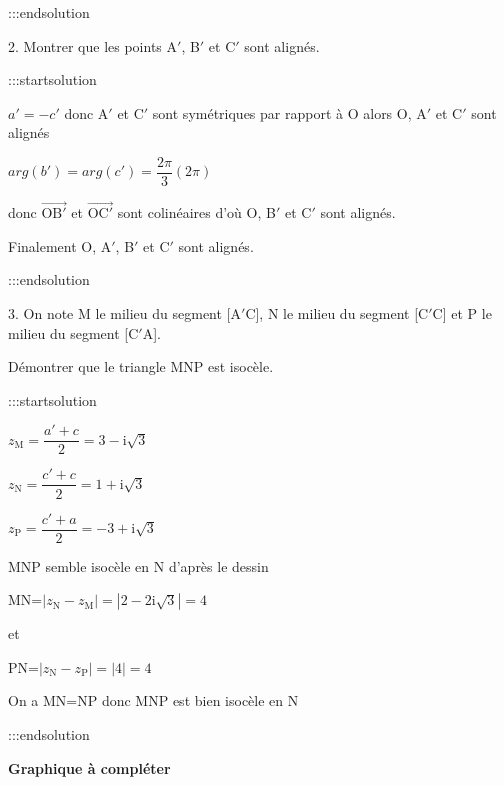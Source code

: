 \documentclass{cornouaille}
\begin{document}
:::endsolution





2.   Montrer que les points A$'$, B$'$ et C$'$ sont alignés.


:::startsolution


$a'=-c'$ donc A$'$ et C$'$ sont symétriques par rapport à O alors O, A$'$ et C$'$ sont alignés

$arg\left( b'\right) =arg\left( c'\right) =\dfrac{2\pi}{3} (2\pi)$

donc $\overrightarrow{\text{OB}'}$ et $\overrightarrow{\text{OC}'}$ sont colinéaires d'où O, B$'$ et C$'$ sont alignés.

Finalement O, A$'$, B$'$ et C$'$ sont alignés.


:::endsolution



3.   On note M le milieu du segment [A$'$C], N le milieu du segment [C$'$C] et P le milieu du
segment [C$'$A].

Démontrer que le triangle MNP est isocèle.


:::startsolution


$z_{\text{M}}=\dfrac{a'+c}{2}=3-\text{i}\sqrt{3}$

$z_{\text{N}}=\dfrac{c'+c}{2}=1+\text{i}\sqrt{3}$

$z_{\text{P}}=\dfrac{c'+a}{2}=-3+\text{i}\sqrt{3}$

MNP semble isocèle en N d'après le dessin

MN=$\left|z_{\text{N}}-z_{\text{M}} \right| = \left|2-2\text{i}\sqrt{3} \right| =4$

et

PN=$\left|z_{\text{N}}-z_{\text{P}} \right| =\left|4 \right| = 4$

On a MN=NP donc MNP est bien isocèle en N


:::endsolution



\bigskip




\textbf{Graphique à compléter}

\bigskip

\end{document}
